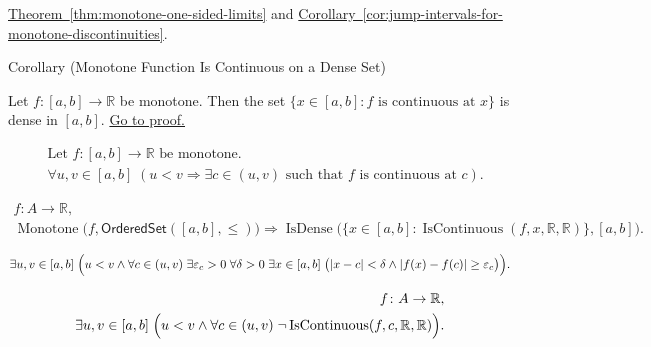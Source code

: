 \begin{dependencies}
\hyperref[thm:monotone-one-sided-limits]{Theorem~\ref{thm:monotone-one-sided-limits}} and \hyperref[cor:jump-intervals-for-monotone-discontinuities]{Corollary~\ref{cor:jump-intervals-for-monotone-discontinuities}}.
\end{dependencies}

\begin{corollarybox}{Corollary (Monotone Function Is Continuous on a Dense Set)}
\begin{corollary}
\label{cor:monotone-continuous-on-dense-set}
Let $f:[a,b]\to\mathbb{R}$ be monotone. Then the set $\{x\in[a,b]:f \text{ is continuous at } x\}$ is dense in $[a,b]$.
\hyperref[prf:monotone-continuous-on-dense-set]{Go to proof.}
\end{corollary}
\end{corollarybox}

\begin{remark*}
\[
\begin{aligned}
&\text{Let } f:[a,b]\to\mathbb{R} \text{ be monotone.}\\
&\forall u,v\in[a,b] \; (u<v \Rightarrow \exists c\in(u,v)\text{ such that }f \text{ is continuous at } c).
\end{aligned}
\]
\end{remark*}

\begin{remark*}
\[
\begin{aligned}
  f\colon A\to\mathbb{R},\\
\operatorname{Monotone}\bigl(f,\mathsf{OrderedSet}([a,b],\leq)\bigr)
\Longrightarrow
\operatorname{IsDense}\bigl(\{x\in[a,b]:\operatorname{IsContinuous}(f,x,\mathbb{R},\mathbb{R})\},[a,b]\bigr).
\end{aligned}
\]
\end{remark*}

\begin{remark*}
\[
\exists u,v\in[a,b]\;
\Bigl(u<v \land
\forall c\in(u,v)\;\exists \varepsilon_c>0\;\forall \delta>0\;\exists x\in[a,b]\;
\bigl(|x-c|<\delta\land |f(x)-f(c)|\ge\varepsilon_c\bigr)\Bigr).
\]
\end{remark*}

\begin{remark*}
\[
\begin{aligned}
  f\colon A\to\mathbb{R},\\
\exists u,v\in[a,b]\;
\Bigl(u<v \land
\forall c\in(u,v)\;\neg\operatorname{IsContinuous}(f,c,\mathbb{R},\mathbb{R})\Bigr).
\end{aligned}
\]
\end{remark*}

